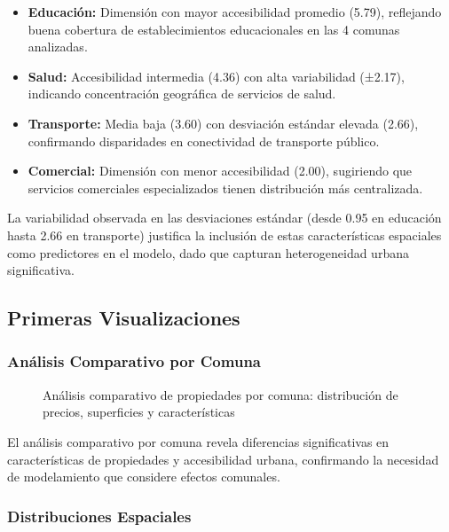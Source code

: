 \begin{itemize}
    \item \textbf{Educación:} Dimensión con mayor accesibilidad promedio (5.79), reflejando buena cobertura de establecimientos educacionales en las 4 comunas analizadas.
    \item \textbf{Salud:} Accesibilidad intermedia (4.36) con alta variabilidad (±2.17), indicando concentración geográfica de servicios de salud.
    \item \textbf{Transporte:} Media baja (3.60) con desviación estándar elevada (2.66), confirmando disparidades en conectividad de transporte público.
    \item \textbf{Comercial:} Dimensión con menor accesibilidad (2.00), sugiriendo que servicios comerciales especializados tienen distribución más centralizada.
\end{itemize}

La variabilidad observada en las desviaciones estándar (desde 0.95 en educación hasta 2.66 en transporte) justifica la inclusión de estas características espaciales como predictores en el modelo, dado que capturan heterogeneidad urbana significativa.

\subsection{Primeras Visualizaciones}

\subsubsection{Análisis Comparativo por Comuna}

\begin{figure}[H]
    \centering
    \caption{Análisis comparativo de propiedades por comuna: distribución de precios, superficies y características}
    \label{fig:analisis_comunas}
\end{figure}

El análisis comparativo por comuna revela diferencias significativas en características de propiedades y accesibilidad urbana, confirmando la necesidad de modelamiento que considere efectos comunales.

\subsubsection{Distribuciones Espaciales}

